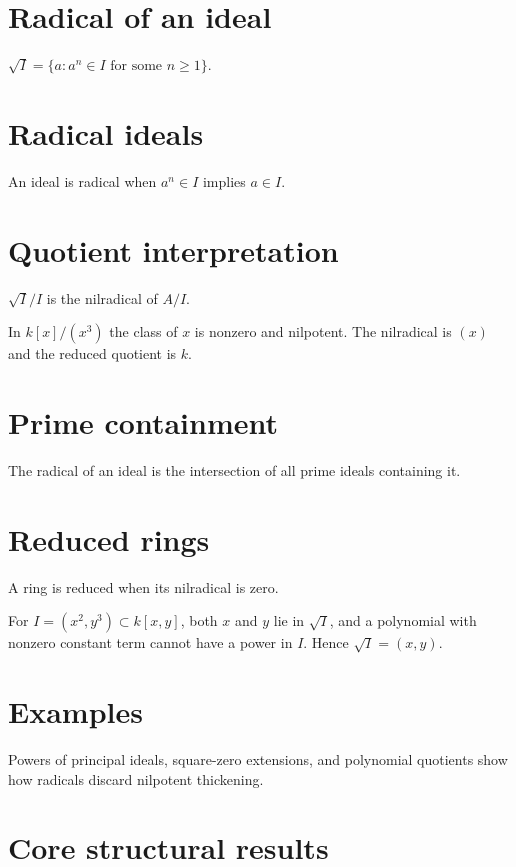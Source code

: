 \section{Radical of an ideal}
$\sqrt I=\{a:a^n\in I\text{ for some }n\ge1\}$.

\section{Radical ideals}
An ideal is radical when $a^n\in I$ implies $a\in I$.

\section{Quotient interpretation}
$\sqrt I/I$ is the nilradical of $A/I$.

\begin{example}\label{ex:v03-expand-02}
In $k[x]/(x^3)$ the class of $x$ is nonzero and nilpotent. The nilradical is $(x)$ and the reduced quotient is $k$.
\end{example}
\section{Prime containment}
The radical of an ideal is the intersection of all prime ideals containing it.

\section{Reduced rings}
A ring is reduced when its nilradical is zero.

\begin{example}\label{ex:v03-expand-03}
For $I=(x^2,y^3)\subset k[x,y]$, both $x$ and $y$ lie in $\sqrt I$, and a polynomial with nonzero constant term cannot have a power in $I$. Hence $\sqrt I=(x,y)$.
\end{example}
\section{Examples}
Powers of principal ideals, square-zero extensions, and polynomial quotients show how radicals discard nilpotent thickening.

\section{Core structural results}

